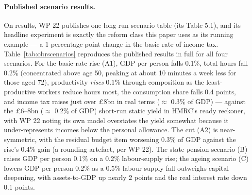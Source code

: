 \paragraph{Published scenario results.} On results, WP 22 publishes one long-run scenario table (its Table 5.1), and its headline experiment is exactly the reform class this paper uses as its running example --- a 1 percentage point change in the basic rate of income tax. Table~\ref{tab:obrscenarios} reproduces the published results in full for all four scenarios. For the basic-rate rise (A1), GDP per person falls 0.1\%, total hours fall 0.2\% (concentrated above age 50, peaking at about 10 minutes a week less for those aged 72), productivity \emph{rises} 0.1\% through composition as the least-productive workers reduce hours most, the consumption share falls 0.4 points, and income tax raises just over \pounds 8bn in real terms ($\approx$ 0.3\% of GDP) --- against the \pounds 6--8bn ($\approx$ 0.2\% of GDP) short-run static yield in HMRC's ready reckoner, with WP 22 noting its own model overstates the yield somewhat because it under-represents incomes below the personal allowance. The cut (A2) is near-symmetric, with the residual budget item worsening 0.3\% of GDP against the rise's 0.4\% gain (a rounding artefact, per WP 22). The state-pension scenario (B) raises GDP per person 0.1\% on a 0.2\% labour-supply rise; the ageing scenario (C) lowers GDP per person 0.2\% as a 0.5\% labour-supply fall outweighs capital deepening, with assets-to-GDP up nearly 2 points and the real interest rate down 0.1 points.

